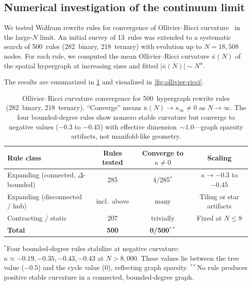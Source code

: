 \documentclass[11pt]{article}
\theoremstyle{definition}
\theoremstyle{remark}
\begin{document}
\subsection{Numerical investigation of the continuum limit}
\label{sec:numerical}

We tested Wolfram rewrite rules for convergence of Ollivier--Ricci
curvature~\cite{Ollivier2009} in the large-$N$ limit.
An initial survey of 13~rules was extended to a systematic search of
500~rules (282~binary, 218~ternary) with evolution up to $N = 18{,}508$
nodes. For each rule, we computed the mean Ollivier--Ricci
curvature $\bar{\kappa}(N)$ of the spatial hypergraph at increasing sizes
and fitted $|\bar{\kappa}(N)| \sim N^\alpha$.

The results are summarized in \cref{tab:curvature} and visualized in \cref{fig:ollivier-ricci}.

\begin{table}[ht]
\centering
\caption{Ollivier--Ricci curvature convergence for 500~hypergraph rewrite
rules (282~binary, 218~ternary). ``Converge'' means
$\bar{\kappa}(N) \to \kappa_\infty \neq 0$ as $N \to \infty$.
The four bounded-degree rules show nonzero stable curvature but converge
to negative values ($-0.3$ to $-0.45$) with effective
dimension~$\sim 1.0$---graph sparsity artifacts, not manifold-like
geometry.}
\label{tab:curvature}
\begin{tabular}{@{}lccc@{}}
\toprule
Rule class & Rules tested & Converge to $\kappa \neq 0$ & Scaling \\
\midrule
Expanding (connected, $\Delta$-bounded) & 285 & 4/285${}^*$
    & $\kappa \to -0.3$ to $-0.45$ \\
Expanding (disconnected / hub) & incl.\ above & many
    & Tiling or star artifacts \\
Contracting / static   & 207 & trivially & Fixed at $N \leq 8$ \\
\midrule
\textbf{Total}         & \textbf{500} & \textbf{0/500}${}^{**}$ & \\
\bottomrule
\end{tabular}

\medskip\noindent
{\footnotesize ${}^*$Four bounded-degree rules stabilize at negative
curvature: $\kappa \approx -0.19, -0.35, -0.43, -0.43$ at
$N > 8{,}000$. These values lie between the tree value ($-0.5$)
and the cycle value ($0$), reflecting graph sparsity.
${}^{**}$No rule produces positive stable curvature in a connected,
bounded-degree graph.}
\end{table}
\end{document}
